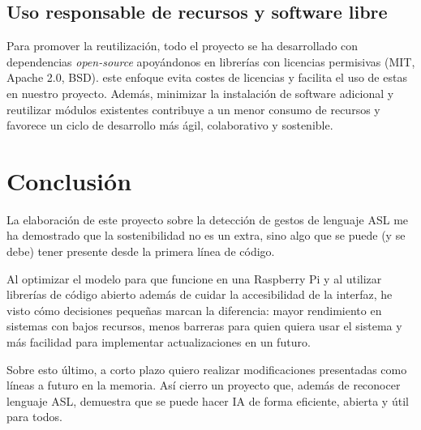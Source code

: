 \subsection{Uso responsable de recursos y software libre}
Para promover la reutilización, todo el proyecto se ha desarrollado con dependencias \textit{open-source} apoyándonos en librerías con licencias permisivas (MIT, Apache 2.0, BSD). este enfoque evita costes de licencias y facilita el uso de estas en nuestro proyecto. Además, minimizar la instalación de software adicional y reutilizar módulos existentes contribuye a un menor consumo de recursos y favorece un ciclo de desarrollo más ágil, colaborativo y sostenible.




\section{Conclusión}
La elaboración de este proyecto sobre la detección de gestos de lenguaje ASL me ha demostrado que la sostenibilidad no es un extra, sino algo que se puede (y se debe) tener presente desde la primera línea de código.

Al optimizar el modelo para que funcione en una Raspberry Pi y al utilizar librerías de código abierto además de cuidar la accesibilidad de la interfaz, he visto cómo decisiones pequeñas marcan la diferencia: mayor rendimiento en sistemas con bajos recursos, menos barreras para quien quiera usar el sistema y más facilidad para implementar actualizaciones en un futuro.

Sobre esto último, a corto plazo quiero realizar modificaciones presentadas como líneas a futuro en la memoria. Así cierro un proyecto que, además de reconocer lenguaje ASL, demuestra que se puede hacer IA de forma eficiente, abierta y útil para todos.